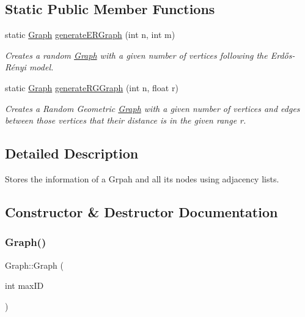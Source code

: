 \subsection*{Static Public Member Functions}
\begin{DoxyCompactItemize}
\item 
static \hyperlink{classGraph}{Graph} \hyperlink{classGraph_a09cc21800f82465a691a53bf9cd4c0e8}{generate\+E\+R\+Graph} (int n, int m)
\begin{DoxyCompactList}\small\item\em Creates a random \hyperlink{classGraph}{Graph} with a given number of vertices following the Erdős-\/\+Rényi model. \end{DoxyCompactList}\item 
static \hyperlink{classGraph}{Graph} \hyperlink{classGraph_a17572d393dd57dc5dae485f215f75aad}{generate\+R\+G\+Graph} (int n, float r)
\begin{DoxyCompactList}\small\item\em Creates a Random Geometric \hyperlink{classGraph}{Graph} with a given number of vertices and edges between those vertices that their distance is in the given range \textquotesingle{}r\textquotesingle{}. \end{DoxyCompactList}\end{DoxyCompactItemize}


\subsection{Detailed Description}
Stores the information of a Grpah and all its nodes using adjacency lists. 

\subsection{Constructor \& Destructor Documentation}
\mbox{\label{classGraph_a2d6e8bbe5d266e468dab445de71607ff}} 
\subsubsection{\texorpdfstring{Graph()}{Graph()}}
{\footnotesize\ttfamily Graph\+::\+Graph (\begin{DoxyParamCaption}\item[{int}]{max\+ID }\end{DoxyParamCaption})}



